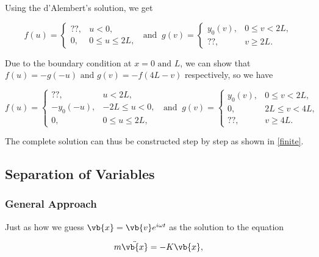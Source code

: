 \documentclass[a4paper,12pt]{report}
\begin{document}
Using the d'Alembert's solution, we get 

\begin{equation}
	f(u) = \begin{cases}
		??,& u < 0,\\
		0,& 0 \le u \le 2L,
	\end{cases} ~\text { and }~ g(v) = \begin{cases}
		y_0 (v),& 0 \le  v < 2L,\\
		?? ,& v \ge 2L.
	\end{cases}
\end{equation}

Due to the boundary condition at \(x=0 \text { and } L\), we can show that \(f(u) = -g(-u) \text { and } g(v) = -f(4L-v)\) respectively, so we have

\begin{equation}
	f(u) = \begin{cases}
		??,& u < 2L,\\
		-y_0 (-u),& -2L \le u <0,\\
		0,& 0 \le u \le 2L,
	\end{cases} ~\text { and }~ g(v) = \begin{cases}
		y_0 (v),& 0 \le  v < 2L,\\
		0,& 2L \le v <4L,\\ 
		?? ,& v \ge 4L.
	\end{cases}
\end{equation}

The complete solution can thus be constructed step by step as shown in \cref{finite}.






\subsection{Separation of Variables} \label{sepvar} 

\subsubsection{General Approach}

Just as how we guess \(\vb{x} = \vb{v} e^{i \omega t} \) as the solution to the equation

\begin{equation}
	m\ddot{\vb{x} } = -K\vb{x} ,  
\end{equation}
\end{document}
